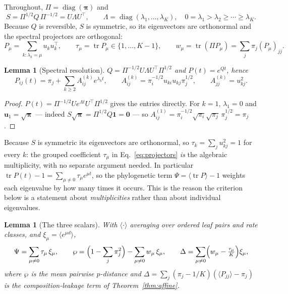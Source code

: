 \documentclass[11pt]{article}
\newcommand{\bpi}{\boldsymbol{\pi}}
\newcommand{\tr}{\operatorname{tr}}
\newtheorem{lemma}[theorem]{Lemma}
\theoremstyle{definition}
\theoremstyle{remark}
\begin{document}
Throughout, $\Pi=\operatorname{diag}(\bpi)$ and
\begin{equation}
  S=\Pi^{1/2}Q\,\Pi^{-1/2}=U\Lambda U^{\!\top},\qquad
  \Lambda=\operatorname{diag}(\lambda_1,\dots,\lambda_K),\quad
  0=\lambda_1>\lambda_2\ge\cdots\ge\lambda_K .
\end{equation}
Because $Q$ is reversible, $S$ is symmetric, so its eigenvectors are
orthonormal and the spectral projectors are orthogonal:
\begin{equation}
  P_\mu=\sum_{k:\lambda_k=\mu}u_ku_k^{\!\top},\qquad
  \tau_\mu=\tr P_\mu\in\{1,\dots,K-1\},\qquad
  w_\mu=\tr(\Pi P_\mu)=\sum_j\pi_j(P_\mu)_{jj}.
  \label{eq:projectors}
\end{equation}
\begin{lemma}[Spectral resolution]
\label{lem:spectral}
$Q=\Pi^{-1/2}U\Lambda U^{\!\top}\Pi^{1/2}$ and $P(t)=e^{Qt}$, hence
\begin{equation}
  P_{ij}(t)=\pi_j+\sum_{k\ge2}A^{(k)}_{ij}e^{\lambda_kt},\qquad
  A^{(k)}_{ij}=\pi_i^{-1/2}u_{ki}u_{kj}\pi_j^{1/2},\qquad
  A^{(k)}_{jj}=u_{kj}^2 .
\end{equation}
\end{lemma}

\begin{proof}
$P(t)=\Pi^{-1/2}Ue^{\Lambda t}U^{\!\top}\Pi^{1/2}$ gives the entries directly.
For $k=1$, $\lambda_1=0$ and $\mathbf u_1=\sqrt{\bpi}$ --- indeed
$S\sqrt{\bpi}=\Pi^{1/2}Q\mathbf 1=\mathbf 0$ --- so
$A^{(1)}_{ij}=\pi_i^{-1/2}\sqrt{\pi_i}\sqrt{\pi_j}\,\pi_j^{1/2}=\pi_j$.
\end{proof}

Because $S$ is symmetric its eigenvectors are orthonormal, so
$\tau_k=\sum_ju_{kj}^2=1$ for every $k$: the grouped coefficient
$\tau_\mu$ in Eq.~\eqref{eq:projectors} \emph{is} the algebraic multiplicity,
with no separate argument needed. In particular
$\tr P(t)-1=\sum_{\mu\ne0}\tau_\mu e^{\mu t}$, so the phylogenetic term
$\Psi=\langle\tr P\rangle-1$ weights each eigenvalue by how many times it
occurs. This is the reason the criterion below is a statement about
\emph{multiplicities} rather than about individual eigenvalues.

\begin{lemma}[The three scalars]
\label{lem:scalars}
With $\langle\cdot\rangle$ averaging over ordered leaf pairs and rate classes,
and $\xi_\mu=\langle e^{\mu d}\rangle$,
\begin{equation}
  \Psi=\sum_{\mu\ne0}\tau_\mu\,\xi_\mu,\qquad
  \wp=\Bigl(1-\sum_j\pi_j^2\Bigr)-\sum_{\mu\ne0}w_\mu\,\xi_\mu,\qquad
  \Delta=\sum_{\mu\ne0}\Bigl(w_\mu-\tfrac{\tau_\mu}{K}\Bigr)\xi_\mu ,
  \label{eq:scalars}
\end{equation}
where $\wp$ is the mean pairwise $p$-distance and
$\Delta=\sum_j(\pi_j-1/K)(\langle P_{jj}\rangle-\pi_j)$ is the
composition-leakage term of Theorem~\ref{thm:affine}.
\end{lemma}
\end{document}
